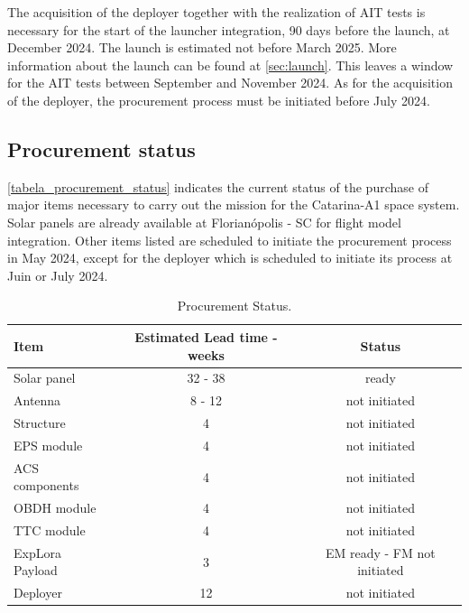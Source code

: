 The acquisition of the deployer together with the realization of \ac{AIT} tests is necessary for the start of the launcher integration, 90 days before the launch, at December 2024. The launch is estimated not before March 2025. More information about the launch can be found at \autoref{sec:launch}. This leaves a window for the \ac{AIT} tests between September and November 2024. As for the acquisition of the deployer, the procurement process must be initiated before July 2024.

\subsection{Procurement status} \label{sec:Procurement_status}

\autoref{tabela_procurement_status} indicates the current status of the purchase of major items necessary to carry out the mission for the Catarina-A1 space system. Solar panels are already available at Florianópolis - SC for flight model integration. Other items listed are scheduled to initiate the procurement process in May 2024, except for the deployer which is scheduled to initiate its process at Juin or July 2024.

\begin{table}[H]
    \centering
    \begin{tabular}{lcc}
        \toprule[1.5pt]
        \textbf{Item} & \textbf{Estimated Lead time - weeks} & \textbf{Status} \\
        \midrule
        Solar panel       & 32 - 38 & ready \\
        Antenna           & 8 - 12  & not initiated \\
        Structure         & 4       & not initiated \\
        \acs{EPS} module  & 4       & not initiated \\
        ACS components    & 4       & not initiated \\
        \acs{OBDH} module & 4       & not initiated \\
        \acs{TTC} module  & 4       & not initiated \\
        ExpLora Payload   & 3       & EM ready - FM not initiated \\
        Deployer          & 12      & not initiated \\
        \bottomrule[1.5pt]
    \end{tabular}
    \caption{Procurement Status.}
    \label{tabela_procurement_status}
\end{table}

